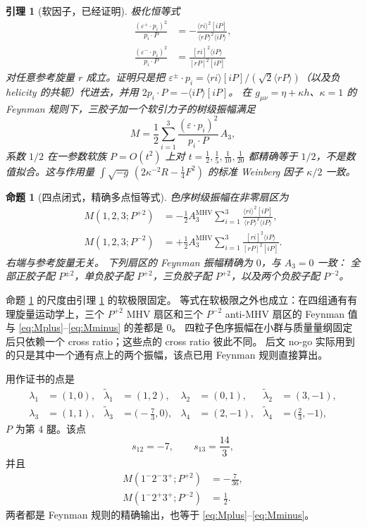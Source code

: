 \documentclass[11pt]{ctexart}
\numberwithin{equation}{section}
\newtheorem{lemma}[theorem]{引理}
\newtheorem{proposition}[theorem]{命题}
\theoremstyle{definition}
\theoremstyle{remark}
\newcommand{\ang}[1]{\langle #1\rangle}
\newcommand{\sq}[1]{[#1]}
\begin{document}
\begin{lemma}[软因子，已经证明]
\label{lem:soft}
极化恒等式
\begin{align}
\frac{(\varepsilon^+\cdot p_i)^2}{p_i\cdot P}
&=-\frac{\ang{ri}^2\sq{iP}}{\ang{rP}^2\ang{iP}},
\label{eq:softplus}\\
\frac{(\varepsilon^-\cdot p_i)^2}{p_i\cdot P}
&=\frac{\sq{ri}^2\ang{iP}}{\sq{rP}^2\sq{iP}}
\label{eq:softminus}
\end{align}
对任意参考旋量 $r$ 成立。证明只是把 $\varepsilon^\pm\cdot p_i=\ang{ri}\sq{iP}/(\sqrt2\ang{rP})$（以及负 helicity 的共轭）代进去，并用 $2p_i\cdot P=-\ang{iP}\sq{iP}$。
在 $g_{\mu\nu}=\eta+\kappa h$、$\kappa=1$ 的 Feynman 规则下，三胶子加一个软引力子的树级振幅满足
\begin{equation}
M=\frac12\sum_{i=1}^3\frac{(\varepsilon\cdot p_i)^2}{p_i\cdot P}\,A_3,
\label{eq:weinberg}
\end{equation}
系数 $1/2$ 在一参数软族 $P=O(t^2)$ 上对 $t=\tfrac12,\tfrac15,\tfrac1{10},\tfrac1{20}$ 都精确等于 $1/2$，不是数值拟合。这与作用量 $\int\sqrt{-g}\,(2\kappa^{-2}R-\tfrac14 F^2)$ 的标准 Weinberg 因子 $\kappa/2$ 一致。
\end{lemma}

\begin{proposition}[四点闭式，精确多点恒等式]
\label{prop:closed}
色序树级振幅在非零扇区为
\begin{align}
M(1,2,3;P^{+2})
&=-\frac12 A_3^{\mathrm{MHV}}
\sum_{i=1}^3\frac{\ang{ri}^2\sq{iP}}{\ang{rP}^2\ang{iP}},
\label{eq:Mplus}\\
M(1,2,3;P^{-2})
&=+\frac12 A_3^{\overline{\mathrm{MHV}}}
\sum_{i=1}^3\frac{\sq{ri}^2\ang{iP}}{\sq{rP}^2\sq{iP}}.
\label{eq:Mminus}
\end{align}
右端与参考旋量无关。
下列扇区的 Feynman 振幅精确为 $0$，与 $A_3=0$ 一致：
全部正胶子配 $P^{\pm2}$，单负胶子配 $P^{+2}$，三负胶子配 $P^{+2}$，以及两个负胶子配 $P^{-2}$。
\end{proposition}

命题 \ref{prop:closed} 的尺度由引理 \ref{lem:soft} 的软极限固定。
等式在软极限之外也成立：在四组通有有理旋量运动学上，三个 $P^{+2}$ MHV 扇区和三个 $P^{-2}$ anti-MHV 扇区的 Feynman 值与 \eqref{eq:Mplus}--\eqref{eq:Mminus} 的差都是 $0$。
四粒子色序振幅在小群与质量量纲固定后只依赖一个 cross ratio；这些点的 cross ratio 彼此不同。
后文 no-go 实际用到的只是其中一个通有点上的两个振幅，该点已用 Feynman 规则直接算出。

用作证书的点是
\begin{align*}
\lambda_1&=(1,0),&
\widetilde\lambda_1&=(1,2),&
\lambda_2&=(0,1),&
\widetilde\lambda_2&=(3,-1),\\
\lambda_3&=(1,1),&
\widetilde\lambda_3&=\bigl(-\tfrac73,0\bigr),&
\lambda_4&=(2,-1),&
\widetilde\lambda_4&=\bigl(\tfrac23,-1\bigr),
\end{align*}
$P$ 为第 $4$ 腿。该点
\[
s_{12}=-7,\qquad s_{13}=\frac{14}{3},
\]
并且
\begin{align}
M(1^-2^-3^+;P^{+2})&=-\frac7{36},
\label{eq:Mp}\\
M(1^-2^+3^+;P^{-2})&=\frac12.
\label{eq:Mm}
\end{align}
两者都是 Feynman 规则的精确输出，也等于 \eqref{eq:Mplus}--\eqref{eq:Mminus}。
\end{document}
